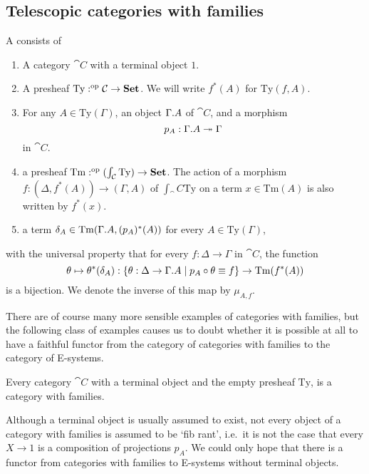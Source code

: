 \subsection{Telescopic categories with families}

\begin{defn}
A  consists of
\begin{enumerate}
\item A category $\cat{C}$ with a terminal object $1$.
\item A presheaf $\mathrm{Ty}:^{\mathrm{op}}{\mathcal{C}}\to\mathbf{Set}$. We will write
$f^\ast(A)$ for $\mathrm{Ty}(f,A)$.
\item For any $A\in\mathrm{Ty}(\Gamma)$, an object $\ctxext{\Gamma}{A}$ of $\cat{C}$, and a morphism
\begin{equation*}
p_A : \ctxext{\Gamma}{A}\twoheadrightarrow \Gamma
\end{equation*}
in $\cat{C}$.
\item a presheaf $\mathrm{Tm}:^{\mathrm{op}}{(\int_\mathcal{C}\mathrm{Ty})}\to\mathbf{Set}$.
The action of a morphism $f:(\Delta,f^\ast(A))\to(\Gamma,A)$ of $\int_\cat{C}\mathrm{Ty}$
on a term $x\in \mathrm{Tm}(A)$ is also written by $f^\ast(x)$.
\item a term $\delta_A\in\mathrm{Tm}(\ctxext{\Gamma}{A},(p_A)^\ast(A))$ for every
$A\in\mathrm{Ty}(\Gamma)$, 
\end{enumerate}
with the universal property that for every $f:\Delta\to\Gamma$ in $\cat{C}$, 
the function
\begin{equation*}
\theta\mapsto\theta^\ast(\delta_A)
  : \{\theta:\Delta\to\ctxext{\Gamma}{A}\mid p_A\circ\theta\jdeq f\}\to
    \mathrm{Tm}(f^\ast(A))
\end{equation*}
is a bijection. We denote the inverse of this map by $\mu_{A,f}$. 
\end{defn}

There are of course many more sensible examples of categories with families,
but the following class of examples causes us to doubt whether it is possible
at all to have a faithful functor from the category of categories
with families to the category of E-systems. 

\begin{eg}
Every category $\cat{C}$ with a terminal object and the empty presheaf 
$\mathrm{Ty}$, is a category with families.
\end{eg}

\begin{rmk}
Although a terminal object is usually assumed to exist, not every object 
of a category with families is assumed to be `fib rant', i.e.~it is
not the case that every $X\to 1$ is a composition of projections $p_A$.
We could only hope that there is a functor from categories with families to E-systems without
terminal objects.
\end{rmk}

